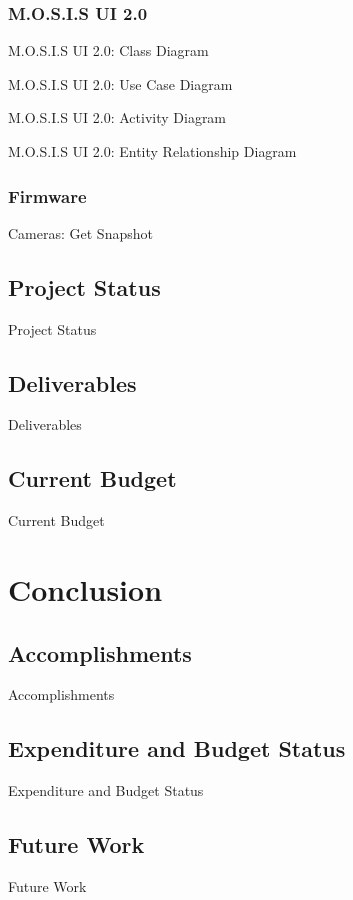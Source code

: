 \documentclass[14pt, aspectratio=169]{beamer}
\begin{document}
\subsubsection{M.O.S.I.S UI 2.0}
\begin{frame}{M.O.S.I.S UI 2.0: Class Diagram}

\end{frame}
\begin{frame}{M.O.S.I.S UI 2.0: Use Case Diagram}

\end{frame}
\begin{frame}{M.O.S.I.S UI 2.0: Activity Diagram}

\end{frame}
\begin{frame}{M.O.S.I.S UI 2.0: Entity Relationship Diagram}

\end{frame}
\subsubsection{Firmware}
\begin{frame}{Cameras: Get Snapshot}

\end{frame}
\subsection{Project Status}
\begin{frame}{Project Status}

\end{frame}
\subsection{Deliverables}
\begin{frame}{Deliverables}

\end{frame}
\subsection{Current Budget}
\begin{frame}{Current Budget}

\end{frame}
\section{Conclusion}
\subsection{Accomplishments}
\begin{frame}{Accomplishments}

\end{frame}
\subsection{Expenditure and Budget Status}
\begin{frame}{Expenditure and Budget Status}

\end{frame}
\subsection{Future Work}
\begin{frame}{Future Work}

\end{frame}
\end{document}
